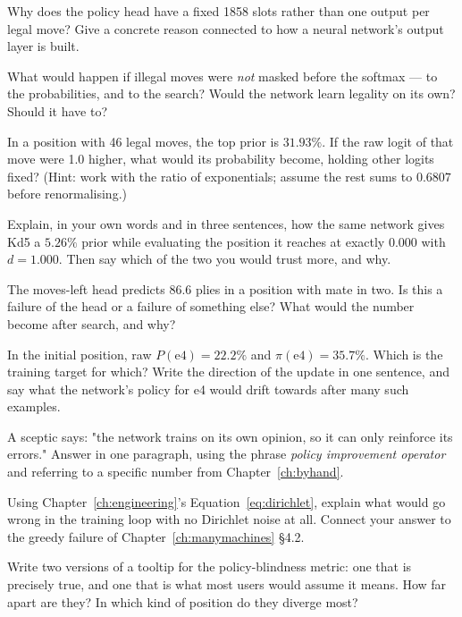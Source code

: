 \begin{exercises}

 Why does the policy head have a fixed 1858 slots
rather than one output per legal move? Give a concrete reason connected to how a neural
network's output layer is built.

 What would happen if illegal moves were \emph{not} masked
before the softmax --- to the probabilities, and to the search? Would the network learn
legality on its own? Should it have to?

 In a position with 46 legal moves, the
top prior is $31.93\%$. If the raw logit of that move were 1.0 higher, what would its
probability become, holding other logits fixed? (Hint: work with the ratio of exponentials;
assume the rest sums to $0.6807$ before renormalising.)

 Explain, in your own words and in three sentences, how
the same network gives Kd5 a $5.26\%$ prior while evaluating the position it reaches at
exactly $0.000$ with $d = 1.000$. Then say which of the two you would trust more, and why.

 The moves-left head predicts $86.6$ plies in a position with
mate in two. Is this a failure of the head or a failure of something else? What would the
number become after search, and why?

 In the initial position, raw $P(\text{e4}) = 22.2\%$
and $\pi(\text{e4}) = 35.7\%$. Which is the training target for which? Write the direction of
the update in one sentence, and say what the network's policy for e4 would drift towards after
many such examples.

 A sceptic says: "the network trains on its
own opinion, so it can only reinforce its errors." Answer in one paragraph, using the phrase
\emph{policy improvement operator} and referring to a specific number from
Chapter~\ref{ch:byhand}.

 Using Chapter~\ref{ch:engineering}'s
Equation~\eqref{eq:dirichlet}, explain what would go wrong in the training loop with no
Dirichlet noise at all. Connect your answer to the greedy failure of
Chapter~\ref{ch:manymachines} §4.2.

 Write two versions of a tooltip for the
policy-blindness metric: one that is precisely true, and one that is what most users would
assume it means. How far apart are they? In which kind of position do they diverge most?


\end{exercises}
